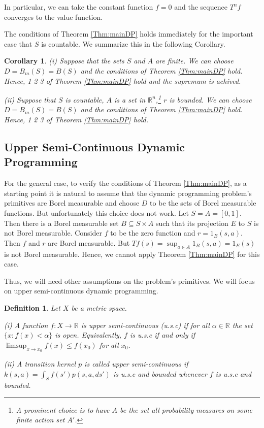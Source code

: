 \documentclass[letter,11pt]{article}
\newtheorem{corollary}{Corollary}[section]
\newtheorem{definition}{Definition}[section]
\begin{document}
In particular, we can take the constant function $f=0$ and the sequence $T^{n}f$ converges to the value function. 

The conditions of Theorem \ref{Thm:mainDP} holds immediately for the important case that $S$ is countable. We summarize this in the following Corollary. 

\begin{corollary}
   (i) Suppose that the sets $S$ and $A$ are finite.  We can choose $D=B_{m}(S)=B(S)$ and the conditions of Theorem \ref{Thm:mainDP} hold. Hence, 1 2 3 of Theorem \ref{Thm:mainDP} hold and the supremum is achived. 

   (ii) Suppose that $S$ is countable, $A$ is a set in $\mathbb{R}^{n}$,\footnote{A prominent choice is to have $A$ be the set all probability measures  on some finite action set $A'$.} $r$ is bounded. We can choose $D=B_{m}(S)=B(S)$ and the conditions of Theorem \ref{Thm:mainDP} hold. Hence, 1 2 3 of Theorem \ref{Thm:mainDP} hold. 
\end{corollary}


\subsection{Upper Semi-Continuous Dynamic Programming}


For the general case, to verify the conditions of Theorem \ref{Thm:mainDP}, as a starting point it is natural to assume that the dynamic programming problem's primitives  are Borel measurable and  choose $D$ to be the sets of Borel measurable functions. But unfortunately this choice does not work. 
Let $S=A=[0,1]$. Then there is a Borel measurable set $B \subseteq S \times A$ such that its projection $E$ to $S$ is not Borel measurable.  Consider $f$ to be the zero function and $r = 1_{B}(s,a)$. Then $f$ and $r$ are Borel measurable. But $Tf (s) = \sup_{a \in A} 1_{B}(s,a) = 1_{E}(s)$ is not Borel measurable. Hence, we cannot apply Theorem \ref{Thm:mainDP} for this case. 

Thus, we will need other assumptions on the problem's primitives. We will focus on upper semi-continuous dynamic programming. 

\begin{definition}
Let $X$ be a metric space. 

    (i) A function $f:X \rightarrow \mathbb{R}$ is upper semi-continuous (u.s.c) if for all $\alpha \in \mathbb{R}$ the set $\{x: f(x) < \alpha \}$ is open. Equivalently, $f$ is u.s.c if and only if $\limsup_{x \rightarrow x_{0} } f(x) \leq f(x_{0}) $ for all $x_{0}$. 

    (ii) A transition kernel $p$ is called upper semi-continuous  if $k(s,a) = \int _{S} f(s')p(s,a,ds')$ is u.s.c and bounded whenever $f$ is u.s.c and bounded.
\end{definition}
\end{document}
